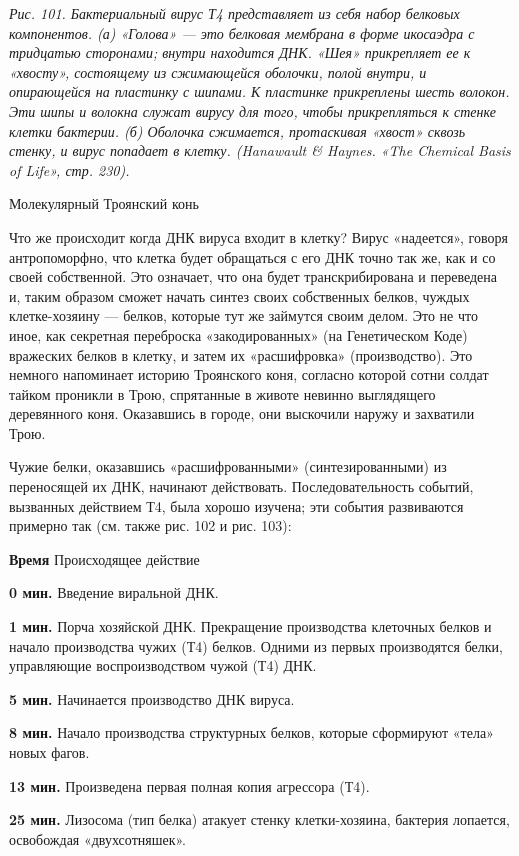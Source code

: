 \emph{Рис. 101. Бактериальный вирус Т4 представляет из себя набор белковых компонентов. (а) «Голова» --- это белковая мембрана в форме икосаэдра с тридцатью сторонами; внутри находится ДНК. «Шея» прикрепляет ее к «хвосту», состоящему из сжимающейся оболочки, полой внутри, и опирающейся на пластинку с шипами. К пластинке прикреплены шесть волокон. Эти шипы и волокна служат вирусу для того, чтобы прикрепляться к стенке клетки бактерии. (б) Оболочка сжимается, протаскивая «хвост» сквозь стенку, и вирус попадает в клетку. (Hanawault \& Haynes. «The Chemical Basis of Life», стр. 230).}

Молекулярный Троянский конь

Что же происходит когда ДНК вируса входит в клетку? Вирус «надеется», говоря антропоморфно, что клетка будет обращаться с его ДНК точно так же, как и со своей собственной. Это означает, что она будет транскрибирована и переведена и, таким образом сможет начать синтез своих собственных белков, чуждых клетке-хозяину --- белков, которые тут же займутся своим делом. Это не что иное, как секретная переброска «закодированных» (на Генетическом Коде) вражеских белков в клетку, и затем их «расшифровка» (производство). Это немного напоминает историю Троянского коня, согласно которой сотни солдат тайком проникли в Трою, спрятанные в животе невинно выглядящего деревянного коня. Оказавшись в городе, они выскочили наружу и захватили Трою.

Чужие белки, оказавшись «расшифрованными» (синтезированными) из переносящей их ДНК, начинают действовать. Последовательность событий, вызванных действием Т4, была хорошо изучена; эти события развиваются примерно так (см. также рис. 102 и рис. 103):

\textbf{Время} Происходящее действие

\textbf{0 мин.} Введение виральной ДНК.

\textbf{1 мин.} Порча хозяйской ДНК. Прекращение производства клеточных белков и начало производства чужих (Т4) белков. Одними из первых производятся белки, управляющие воспроизводством чужой (Т4) ДНК.

\textbf{5 мин.} Начинается производство ДНК вируса.

\textbf{8 мин.} Начало производства структурных белков, которые сформируют «тела» новых фагов.

\textbf{13 мин.} Произведена первая полная копия агрессора (Т4).

\textbf{25 мин.} Лизосома (тип белка) атакует стенку клетки-хозяина, бактерия лопается, освобождая «двухсотняшек».

